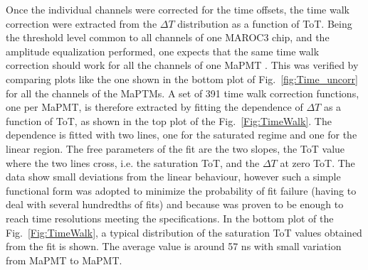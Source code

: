 \documentclass[5p,times,twocolumn]{elsarticle}
\def\MaPMT{MaPMT }
\begin{document}
Once the individual channels were corrected for the time offsets, the time walk correction were extracted from the $\Delta T$ distribution as a function of ToT. Being the threshold level common to all channels of one MAROC3 chip, and the amplitude equalization performed, one expects that the same time walk correction should work for all the channels of one \MaPMT. This was verified by comparing plots like the one shown in the bottom plot of Fig.~\ref{fig:Time_uncorr} for all the channels of the MaPTMs. A set of 391 time walk correction functions, one per MaPMT, is therefore extracted by fitting the dependence of $\Delta T$ as a function of ToT, as shown in the top plot of the Fig.~\ref{Fig:TimeWalk}. The dependence is fitted with two lines, one for the saturated regime and one for the linear region. The free parameters of the fit are the two slopes, the ToT value where the two lines cross, i.e. the saturation ToT, and the $\Delta T$ at zero ToT. The data show small deviations from the linear behaviour, however such a simple functional form was adopted to minimize the probability of fit failure (having to deal with several hundredths of fits) and because was proven to be enough to reach time resolutions meeting the specifications. In the bottom plot of the Fig.~\ref{Fig:TimeWalk}, a typical distribution of the saturation ToT values obtained from the fit is shown. The average value is around 57 ns with small variation from \MaPMT to MaPMT.
\end{document}
